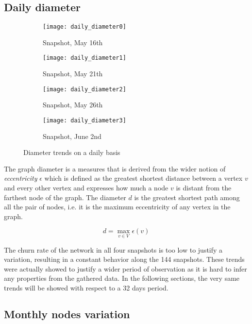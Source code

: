 	\subsection{Daily diameter}
	
		\begin{figure}[h]
		\centering
		\begin{subfigure}{0.45\textwidth}
			\centering
			\texttt{[image: daily\_diameter0]}
			\caption{Snapshot, May 16th}
			\label{daily_diameter0}
		\end{subfigure}
		\begin{subfigure}{0.45\textwidth}
			\centering
			\texttt{[image: daily\_diameter1]}
			\caption{Snapshot, May 21th}
			\label{daily_diameter1}
		\end{subfigure}
		\begin{subfigure}{0.45\textwidth}
			\centering
			\texttt{[image: daily\_diameter2]}
			\caption{Snapshot, May 26th}
			\label{daily_diameter2}
		\end{subfigure}
		\begin{subfigure}{0.45\textwidth}
			\centering
			\texttt{[image: daily\_diameter3]}
			\caption{Snapshot, June 2nd}
			\label{daily_diameter3}
		\end{subfigure}
		
		\caption{Diameter trends on a daily basis}
		\label{daily_diameter}
	\end{figure}
	
	The graph diameter is a measures that is derived from the wider notion of \textit{eccentricity} $\epsilon$ which is defined as the greatest shortest distance between a vertex \(v\) and every other vertex and expresses how much a node \(v\) is distant from the farthest node of the graph. The diameter \(d\) is the greatest shortest path among all the pair of nodes, i.e. it is the maximum eccentricity of any vertex in the graph.
	
	\[d = \max_{v \in V} \epsilon(v)\]
	
	The churn rate of the network in all four snapshots is too low to justify a variation, resulting in a constant behavior along the 144 snapshots. These trends were actually showed to justify a wider period of observation as it is hard to infer any properties from the gathered data. In the following sections, the very same trends will be showed with respect to a 32 days period. 

	\subsection{Monthly nodes variation}
	
